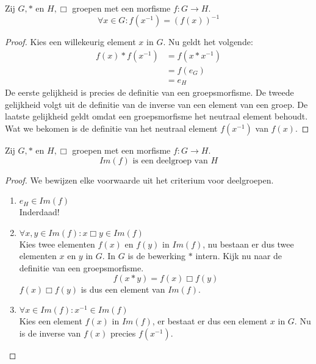 \documentclass[main.tex]{subfiles}
\begin{document}
\begin{st}
  \label{st:groepsmorfisme-behoudt-inverse}
  Zij $G,*$ en $H,\Box$ groepen met een morfisme $f: G \rightarrow H$.
  \[ \forall x \in G: f(x^{-1}) = (f(x))^{-1} \]

  \begin{proof}
    Kies een willekeurig element $x$ in $G$.
    Nu geldt het volgende:
    \[
    \begin{array}{rl}
    f(x) * f(x^{-1}) &= f(x*x^{-1})\\
                    &= f(e_{G})\\
                    &= e_{H}
    \end{array}
    \]
    De eerste gelijkheid is precies de definitie van een groepsmorfisme.
    De tweede gelijkheid volgt uit de definitie van de inverse van een element van een groep.
    De laatste gelijkheid geldt omdat een groepsmorfisme het neutraal element behoudt.
    Wat we bekomen is de definitie van het neutraal element $f(x^{-1})$ van $f(x)$.
  \end{proof}
\end{st}

\begin{st}
  \label{st:beeld-is-deelgroep}
  Zij $G,*$ en $H,\Box$ groepen met een morfisme $f: G \rightarrow H$.
  \[ Im(f) \text{ is een deelgroep van } H \]

  \begin{proof}
    We bewijzen elke voorwaarde uit het criterium voor deelgroepen.
    \begin{enumerate}
    \item $e_{H} \in Im(f)$\\
      Inderdaad!
    \item $\forall x,y \in Im(f): x \Box y \in Im(f)$\\
      Kies twee elementen $f(x)$ en $f(y)$ in $Im(f)$, nu bestaan er dus twee elementen $x$ en $y$ in $G$.
      In $G$ is de bewerking $*$ intern.
      Kijk nu naar de definitie van een groepsmorfisme.
      \[ f(x*y) = f(x) \Box f(y) \]
      $f(x) \Box f(y)$ is dus een element van $Im(f)$.
    \item $\forall x \in Im(f): x^{-1} \in Im(f)$\\
      Kies een element $f(x)$ in $Im(f)$, er bestaat er dus een element $x$ in $G$.
      Nu is de inverse van $f(x)$ precies $f(x^{-1})$.
    \end{enumerate}
  \end{proof}
\end{st}
\end{document}
